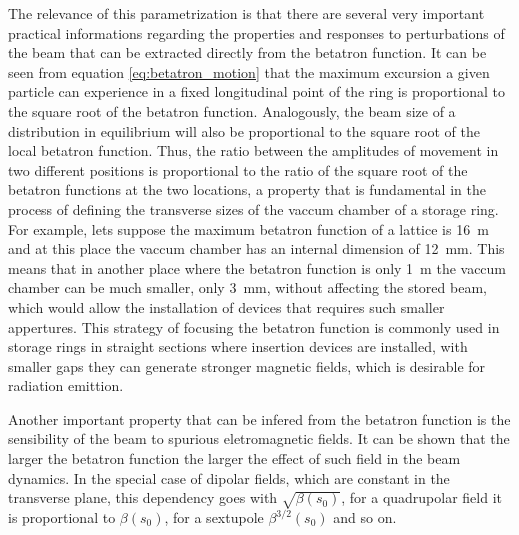\documentclass[
	12pt,				%
	openright,			%
	oneside,			%
	a4paper,		%
	chapter=TITLE,		%
	section=TITLE,		%
    brazil,				%
	english,			%
	sumario=tradicional,
	]{abntex2}
\begin{document}
	The relevance of this parametrization is that there are several very important practical informations regarding the properties and responses to perturbations of the beam that can be extracted directly from the betatron function. It can be seen from equation \ref{eq:betatron_motion} that the maximum excursion a given particle can experience in a fixed longitudinal point of the ring is proportional to the square root of the betatron function. Analogously, the beam size of a distribution in equilibrium will also be proportional to the square root of the local betatron function. Thus, the ratio between the amplitudes of movement in two different positions is proportional to the ratio of the square root of the betatron functions at the two locations, a property that is fundamental in the process of defining the transverse sizes of the vaccum chamber of a storage ring. For example, lets suppose the maximum betatron function of a lattice is \SI{16}{\meter} and at this place the vaccum chamber has an internal dimension of \SI{12}{\milli\meter}. This means that in another place where the betatron function is only \SI{1}{\meter} the vaccum chamber can be much smaller, only \SI{3}{\milli\meter}, without affecting the stored beam, which would allow the installation of devices that requires such smaller appertures. This strategy of focusing the betatron function is commonly used in storage rings in straight sections where insertion devices are installed, with smaller gaps they can generate stronger magnetic fields, which is desirable for radiation emittion.

	Another important property that can be infered from the betatron function is the sensibility of the beam to spurious eletromagnetic fields. It can be shown that the larger the betatron function the larger the effect of such field in the beam dynamics. In the special case of dipolar fields, which are constant in the transverse plane, this dependency goes with $\sqrt{\beta(s_0)}$, for a quadrupolar field it is proportional to $\beta(s_0)$, for a sextupole $\beta^{3/2}(s_0)$ and so on.
\end{document}
